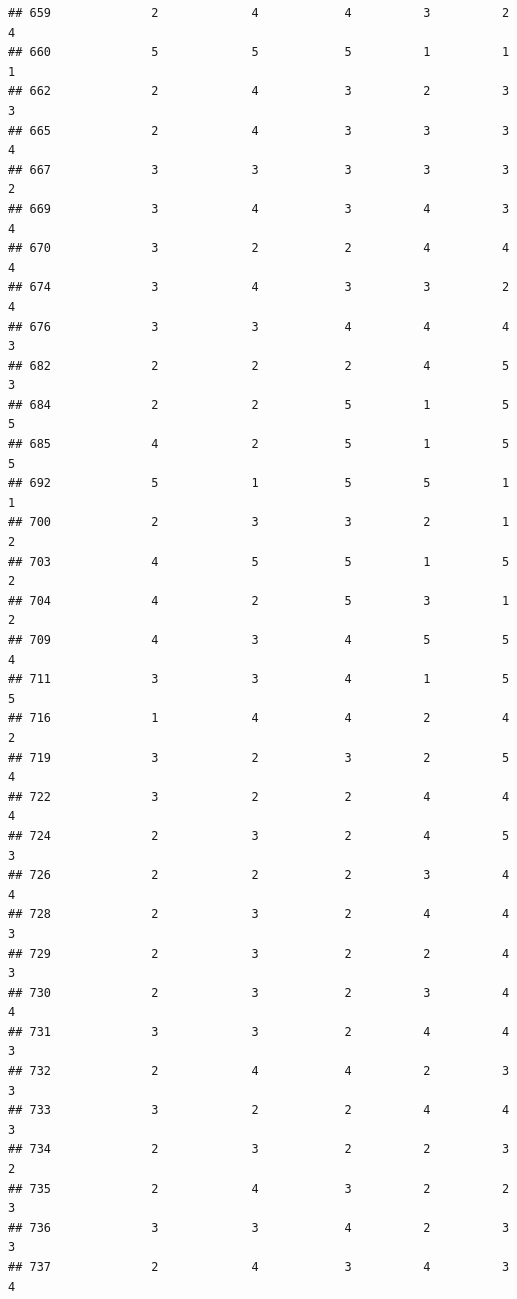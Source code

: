\documentclass[
]{article}
\begin{document}
\begin{verbatim}
## 659              2             4            4          3          2        4
## 660              5             5            5          1          1        1
## 662              2             4            3          2          3        3
## 665              2             4            3          3          3        4
## 667              3             3            3          3          3        2
## 669              3             4            3          4          3        4
## 670              3             2            2          4          4        4
## 674              3             4            3          3          2        4
## 676              3             3            4          4          4        3
## 682              2             2            2          4          5        3
## 684              2             2            5          1          5        5
## 685              4             2            5          1          5        5
## 692              5             1            5          5          1        1
## 700              2             3            3          2          1        2
## 703              4             5            5          1          5        2
## 704              4             2            5          3          1        2
## 709              4             3            4          5          5        4
## 711              3             3            4          1          5        5
## 716              1             4            4          2          4        2
## 719              3             2            3          2          5        4
## 722              3             2            2          4          4        4
## 724              2             3            2          4          5        3
## 726              2             2            2          3          4        4
## 728              2             3            2          4          4        3
## 729              2             3            2          2          4        3
## 730              2             3            2          3          4        4
## 731              3             3            2          4          4        3
## 732              2             4            4          2          3        3
## 733              3             2            2          4          4        3
## 734              2             3            2          2          3        2
## 735              2             4            3          2          2        3
## 736              3             3            4          2          3        3
## 737              2             4            3          4          3        4

\end{verbatim}
\end{document}
